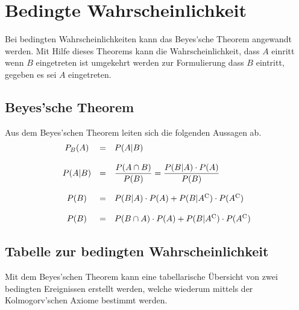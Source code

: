 \section{Bedingte Wahrscheinlichkeit}
Bei bedingten Wahrscheinlichkeiten kann das \gls{Beyes'sche Theorem} 
angewandt werden. Mit Hilfe dieses Theorems kann die Wahrscheinlichkeit, 
dass $A$ einritt wenn $B$ eingetreten ist umgekehrt werden zur 
Formulierung dass $B$ eintritt, gegeben es sei $A$ eingetreten.

\subsection{Beyes'sche Theorem}
Aus dem Beyes'schen Theorem leiten sich die folgenden Aussagen ab.
\[ \begin{array}{c c l}
	P_B(A) 
		& = 
		& P(A|B) \\
	& & \\
	P(A|B)
		& = 
		& \displaystyle \frac{P(A \cap B)}{P(B)} 
			= \displaystyle 
			\frac{P(B|A) \cdot P(A)}{P(B)} \\
	& & \\
	P(B) 
		& = 
		& P(B|A) \cdot P(A) 
			+ P(B|A^{\mathrm C}) 
			\cdot P(A^{\mathrm C}) \\
	& & \\
	P(B) 	
		& = 
		& P(B \cap A) \cdot P(A) + P(B|A^{\mathrm C}) 
			\cdot P(A^{\mathrm C})
\end{array} \]

\newpage
\subsection{Tabelle zur bedingten Wahrscheinlichkeit}
Mit dem Beyes'schen Theorem kann eine tabellarische Übersicht von
zwei bedingten Ereignissen erstellt werden, welche wiederum mittels
der Kolmogorv'schen Axiome bestimmt werden.

